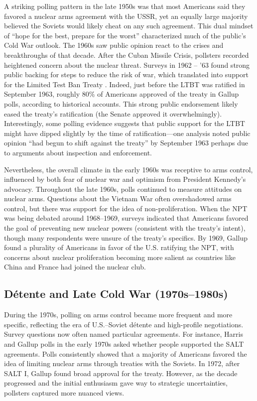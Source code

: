 \documentclass[11,5 pt]{article}
\begin{document}
    A striking polling pattern in the late 1950s was that most Americans said they favored a nuclear arms agreement with the USSR, yet an equally large majority believed the Soviets would likely cheat on any such agreement. This dual mindset of “hope for the best, prepare for the worst” characterized much of the public’s Cold War outlook. The 1960s saw public opinion react to the crises and breakthroughs of that decade. After the Cuban Missile Crisis, pollsters recorded heightened concern about the nuclear threat. Surveys in 1962 – '63 found strong public backing for steps to reduce the risk of war, which translated into support for the Limited Test Ban Treaty \cite{DigitalRepositoryUNM}. Indeed, just before the LTBT was ratified in September 1963, roughly 80\% of Americans approved of the treaty in Gallup polls, according to historical accounts. This strong public endorsement likely eased the treaty’s ratification (the Senate approved it overwhelmingly). Interestingly, some polling evidence suggests that public support for the LTBT might have dipped slightly by the time of ratification—one analysis noted public opinion “had begun to shift against the treaty” by September 1963 perhaps due to arguments about inspection and enforcement. 
    
    Nevertheless, the overall climate in the early 1960s was receptive to arms control, influenced by both fear of nuclear war and optimism from President Kennedy’s advocacy. Throughout the late 1960s, polls continued to measure attitudes on nuclear arms. Questions about the Vietnam War often overshadowed arms control, but there was support for the idea of non-proliferation. When the NPT was being debated around 1968–1969, surveys indicated that Americans favored the goal of preventing new nuclear powers (consistent with the treaty’s intent), though many respondents were unsure of the treaty’s specifics. By 1969, Gallup found a plurality of Americans in favor of the U.S. ratifying the NPT, with concerns about nuclear proliferation becoming more salient as countries like China and France had joined the nuclear club.
    
    
\subsection*{Détente and Late Cold War (1970s–1980s)}

    During the 1970s, polling on arms control became more frequent and more specific, reflecting the era of U.S.–Soviet détente and high-profile negotiations. Survey questions now often named particular agreements. For instance, Harris and Gallup polls in the early 1970s asked whether people supported the SALT agreements. Polls consistently showed that a majority of Americans favored the idea of limiting nuclear arms through treaties with the Soviets. In 1972, after SALT I, Gallup found broad approval for the treaty. However, as the decade progressed and the initial enthusiasm gave way to strategic uncertainties, pollsters captured more nuanced views. 
    
\end{document}

